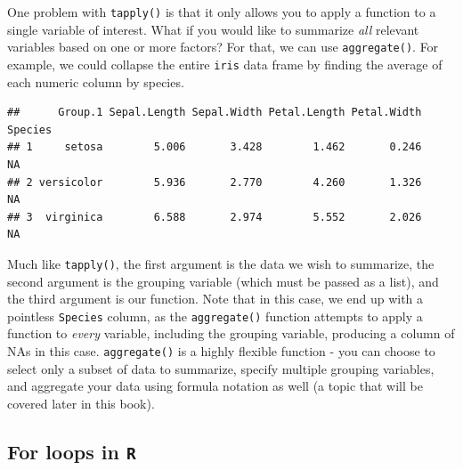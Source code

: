 \documentclass[]{book}
\newenvironment{Shaded}{\begin{snugshade}}{\end{snugshade}}
\newcommand{\CommentTok}[1]{\textcolor[rgb]{0.56,0.35,0.01}{\textit{#1}}}
\newcommand{\DataTypeTok}[1]{\textcolor[rgb]{0.13,0.29,0.53}{#1}}
\newcommand{\KeywordTok}[1]{\textcolor[rgb]{0.13,0.29,0.53}{\textbf{#1}}}
\newcommand{\NormalTok}[1]{#1}
\newcommand{\OperatorTok}[1]{\textcolor[rgb]{0.81,0.36,0.00}{\textbf{#1}}}
\begin{document}
One problem with \texttt{tapply()} is that it only allows you to apply a function to a single variable of interest. What if you would like to summarize \emph{all} relevant variables based on one or more factors? For that, we can use \texttt{aggregate()}. For example, we could collapse the entire \texttt{iris} data frame by finding the average of each numeric column by species.

\begin{Shaded}
\end{Shaded}

\begin{verbatim}
##      Group.1 Sepal.Length Sepal.Width Petal.Length Petal.Width Species
## 1     setosa        5.006       3.428        1.462       0.246      NA
## 2 versicolor        5.936       2.770        4.260       1.326      NA
## 3  virginica        6.588       2.974        5.552       2.026      NA
\end{verbatim}

Much like \texttt{tapply()}, the first argument is the data we wish to summarize, the second argument is the grouping variable (which must be passed as a list), and the third argument is our function. Note that in this case, we end up with a pointless \texttt{Species} column, as the \texttt{aggregate()} function attempts to apply a function to \emph{every} variable, including the grouping variable, producing a column of NAs in this case. \texttt{aggregate()} is a highly flexible function - you can choose to select only a subset of data to summarize, specify multiple grouping variables, and aggregate your data using formula notation as well (a topic that will be covered later in this book).

\hypertarget{for-loops-in-r}{%
\subsection{\texorpdfstring{For loops in \texttt{R}}{For loops in R}}\label{for-loops-in-r}}
\end{document}
